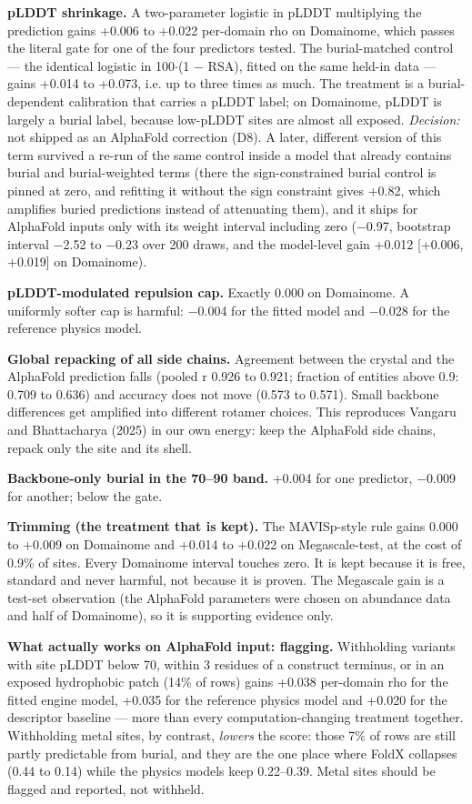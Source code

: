 \documentclass[11pt,a4paper]{article}
\begin{document}
\textbf{pLDDT shrinkage.} A two-parameter logistic in pLDDT multiplying the prediction gains +0.006 to +0.022
per-domain rho on Domainome, which passes the literal gate for one of the four predictors tested. The
burial-matched control --- the identical logistic in 100$\cdot$(1 $-$ RSA), fitted on the same held-in data --- gains
+0.014 to +0.073, i.e. up to three times as much. The treatment is a burial-dependent calibration that carries a
pLDDT label; on Domainome, pLDDT is largely a burial label, because low-pLDDT sites are almost all exposed.
\emph{Decision:} not shipped as an AlphaFold correction (D8). A later, different version of this term survived a
re-run of the same control inside a model that already contains burial and burial-weighted terms (there the
sign-constrained burial control is pinned at zero, and refitting it without the sign constraint gives +0.82,
which amplifies buried predictions instead of attenuating them), and it ships for AlphaFold inputs only with its weight interval including zero ($-$0.97, bootstrap
interval $-$2.52 to $-$0.23 over 200 draws, and the model-level gain +0.012 [+0.006, +0.019] on Domainome).

\textbf{pLDDT-modulated repulsion cap.} Exactly 0.000 on Domainome. A uniformly softer cap is harmful: $-$0.004 for
the fitted model and $-$0.028 for the reference physics model.

\textbf{Global repacking of all side chains.} Agreement between the crystal and the AlphaFold prediction falls
(pooled r 0.926 to 0.921; fraction of entities above 0.9: 0.709 to 0.636) and accuracy does not move
(0.573 to 0.571). Small backbone differences get amplified into different rotamer choices. This reproduces
Vangaru and Bhattacharya (2025) in our own energy: keep the AlphaFold side chains, repack only the site and its
shell.

\textbf{Backbone-only burial in the 70--90 band.} +0.004 for one predictor, $-$0.009 for another; below the gate.

\textbf{Trimming (the treatment that is kept).} The MAVISp-style rule gains 0.000 to +0.009 on Domainome and +0.014
to +0.022 on Megascale-test, at the cost of 0.9\% of sites. Every Domainome interval touches zero. It is kept
because it is free, standard and never harmful, not because it is proven. The Megascale gain is a test-set
observation (the AlphaFold parameters were chosen on abundance data and half of Domainome), so it is supporting
evidence only.

\textbf{What actually works on AlphaFold input: flagging.} Withholding variants with site pLDDT below 70, within 3
residues of a construct terminus, or in an exposed hydrophobic patch (14\% of rows) gains +0.038 per-domain rho
for the fitted engine model, +0.035 for the reference physics model and +0.020 for the descriptor baseline ---
more than every computation-changing treatment together. Withholding metal sites, by contrast, \emph{lowers} the
score: those 7\% of rows are still partly predictable from burial, and they are the one place where FoldX
collapses (0.44 to 0.14) while the physics models keep 0.22--0.39. Metal sites should be flagged and reported,
not withheld.
\end{document}
